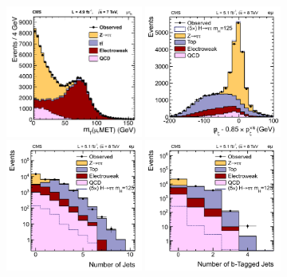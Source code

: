 \documentclass[11pt,twoside,a4paper,cmspaper,final,collab]{cms-tdr}
\begin{document}
\begin{figure}[t!]
\begin{center}
\includegraphics[width=0.4\textwidth]{figures/htt/2011_muTau_mt_fix.pdf}
\includegraphics[width=0.4\textwidth]{figures/htt/pzetavar_fix.pdf} \\
\includegraphics[width=0.4\textwidth]{figures/htt/nalljets_log_fix.pdf}
\includegraphics[width=0.4\textwidth]{figures/htt/nbjets_log_fix.pdf} \\
\end{center}

\end{figure}
\end{document}
